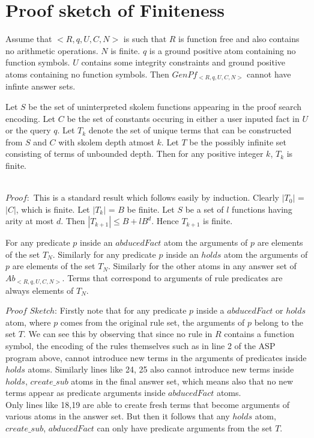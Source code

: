 \documentclass{article}
\begin{document}
\section{Proof sketch of Finiteness}\label{sec:proof_finiteness}
\begin{theorem}[Finiteness]\label{Finiteness}
Assume that $<R,q,U,C,N>$ is such that $R$ is function free and also contains no arithmetic operations. $N$ is finite. $q$ is a ground positive atom containing no function symbols. $U$ contains some integrity constraints and ground positive atoms containing no function symbols. Then $GenPf_{<R,q,U,C,N>}$ cannot have infinte answer sets. 
\end{theorem}
\begin{lemma}
Let $S$ be the set of uninterpreted skolem functions appearing in the proof search encoding. Let $C$ be the set of constants occuring in either a user inputed fact in $U$ or the query $q$. Let $T_{k}$ denote the set of unique terms that can be constructed from $S$ and $C$ with skolem depth atmost $k$. Let $T$ be the possibly infinite set consisting of terms of unbounded depth. Then for any positive integer $k$, $T_{k}$ is finite.
\end{lemma}\\
\newline
$Proof:$ This is a standard result which follows easily by induction. Clearly $|T_{0}|$ = $|C|$, which is finite. Let $|T_{k}|$ = $B$ be finite. Let $S$ be a set of $l$ functions having arity at most $d$. Then $|T_{k+1}|\leq B + lB^{d}$. Hence $T_{k+1}$ is finite.  
\begin{lemma}
 For any predicate $p$ inside an $abducedFact$ atom the arguments of $p$ are elements of the set $T_{N}$. Similarly for any predicate $p$ inside an $holds$ atom the arguments of $p$ are elements of the set $T_{N}$. Similarly for the other atoms in any answer set of $Ab_{<R,q,U,C,N>}$. Terms that correspond to arguments of rule predicates are always elements of $T_{N}$.\\ 
\end{lemma}
$Proof$ $Sketch$: Firstly note that for any predicate $p$ inside a $abducedFact$ or $holds$ atom, where $p$ comes from the original rule set, the arguments of $p$ belong to the set $T$. We can see this by observing that since no rule in $R$ contains a function symbol, the encoding of the rules themselves such as in line 2 of the ASP program above, cannot introduce new terms in the arguments of predicates inside $holds$ atoms. Similarly lines like 24, 25 also cannot introduce new terms inside $holds$, $create\_sub$ atoms in the final answer set, which means also that no new terms appear as predicate arguments inside $abducedFact$ atoms. \\ Only lines like 18,19 are able to create fresh terms that become arguments of various atoms in the answer set. But then it follows that any $holds$ atom, $create\_sub$, $abducedFact$ can only have predicate arguments from the set $T$.    
\end{document}
